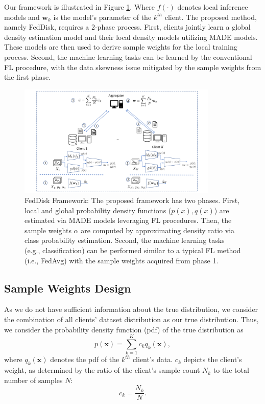\documentclass[journal]{IEEEtai}
\newcommand{\MethodnameShort}{FedDisk}
\begin{document}
Our framework is illustrated in Figure \ref{fig:framework}. Where $f(\cdot)$ denotes local inference models and $\mathbf{w}_k$ is the model's parameter of the $k^{th}$ client. The proposed method, namely \MethodnameShort{}, requires a 2-phase process. First, clients jointly learn a global density estimation model and their local density models utilizing MADE models. These models are then used to derive sample weights for the local training process. Second, the machine learning tasks can be learned by the conventional FL procedure, with the data skewness issue mitigated by the sample weights from the first phase.
\begin{figure}[ht!]
		\centering
		\includegraphics[width=0.85\textwidth, trim={1cm 0.1cm 1cm 0.3cm},clip]{Figures/FL.pdf}
		\caption{ \MethodnameShort{} Framework: The proposed framework has two phases. First, local and global probability density functions ($p(x),q(x)$) are estimated via MADE models leveraging FL procedures. Then, the sample weights $\alpha$ are computed by approximating density ratio via class probability estimation. Second, the machine learning tasks (e.g., classification) can be performed similar to a typical FL method (i.e., FedAvg) with the sample weights acquired from phase 1.} 
		\label{fig:framework} 

\end{figure}  

\subsection{Sample Weights Design}
\label{sec:sample_weight_design}
As we do not have sufficient information about the true distribution, we consider the combination of all clients' dataset distribution as our true distribution. Thus, we consider the probability density function (pdf) of the true distribution as 
\begin{equation}
\label{eq:sumdist}
	 p(\mathbf{x}) = \sum_{k=1}^{K} c_k q_k(\mathbf{x}) ,
\end{equation}
where $q_k(\mathbf{x})$ denotes the pdf of the $k^{th}$ client's data. $c_k$ depicts the client's weight, as determined by the ratio of the client's sample count $N_k$ to the total number of samples $N$: 
\begin{equation}
	c_k=\frac{N_k}{N}.
\end{equation}
\end{document}
